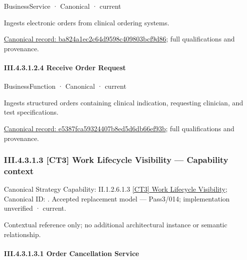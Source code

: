 \label{element:ba824a1ec2c64d9598c409803bcf9d86}
{\small BusinessService · Canonical · current}\par

Ingests electronic orders from clinical ordering systems.


{\footnotesize \href{../../../../../../../../continuum/business/business-service/ba824a1ec2c64d9598c409803bcf9d86.md}{Canonical record: ba824a1ec2c64d9598c409803bcf9d86}; full qualifications and provenance.}\par
\paragraph*{III.4.3.1.2.4 Receive Order Request}
\label{navigation:III.4.3.1.2.4}

\label{element:e5387fca59324407b8ed5d6db66ef93b}
{\small BusinessFunction · Canonical · current}\par

Ingests structured orders containing clinical indication, requesting clinician, and test specifications.


{\footnotesize \href{../../../../../../../../continuum/business/business-function/e5387fca59324407b8ed5d6db66ef93b.md}{Canonical record: e5387fca59324407b8ed5d6db66ef93b}; full qualifications and provenance.}\par
\subsubsection*{III.4.3.1.3 [CT3] Work Lifecycle Visibility — Capability context}
\label{navigation:III.4.3.1.3}

{\small Canonical Strategy Capability: II.1.2.6.1.3 \hyperref[element:5239aba7e072422686d108950a5b0d50]{[CT3] Work Lifecycle Visibility}; Canonical ID: \texttt{}. Accepted replacement model — Pass3/014; implementation unverified · current.}\par
Contextual reference only; no additional architectural instance or semantic relationship.\par
\paragraph*{III.4.3.1.3.1 Order Cancellation Service}
\label{navigation:III.4.3.1.3.1}

